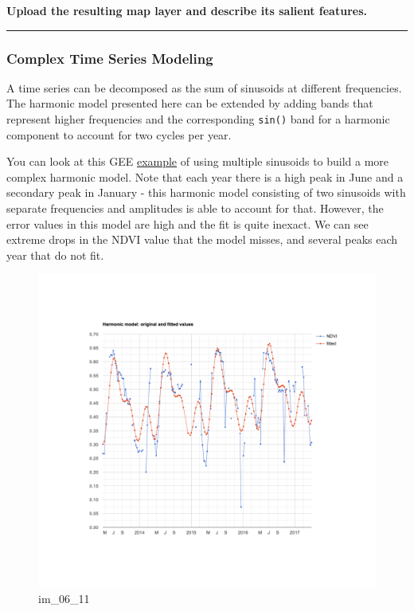 \documentclass[
]{article}
\begin{document}
\textbf{Upload the resulting map layer and describe its salient features.}

\begin{center}\rule{0.5\linewidth}{0.5pt}\end{center}

\hypertarget{complex-time-series-modeling}{%
\subsubsection{Complex Time Series Modeling}\label{complex-time-series-modeling}}

A time series can be decomposed as the sum of sinusoids at different frequencies. The harmonic model presented here can be extended by adding bands that represent higher frequencies and the corresponding \texttt{sin()} band for a harmonic component to account for two cycles per year.

You can look at this GEE \href{https://code.earthengine.google.com/2669122497313113fc4bb81bc8352828}{example} of using multiple sinusoids to build a more complex harmonic model. Note that each year there is a high peak in June and a secondary peak in January - this harmonic model consisting of two sinusoids with separate frequencies and amplitudes is able to account for that. However, the error values in this model are high and the fit is quite inexact. We can see extreme drops in the NDVI value that the model misses, and several peaks each year that do not fit.

\begin{figure}
\centering
\includegraphics{./im/im_06_06.png}
\caption{im\_06\_11}
\end{figure}
\end{document}
